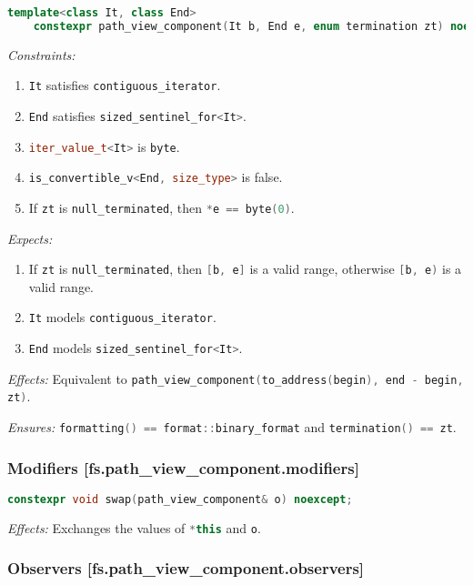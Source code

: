 \documentclass[11pt]{article}
\newcommand{\code}[2][cpp]{\lstinline[language=#1,basicstyle=\small\ttfamily]{#2}}
\newcommand{\desc}[1]{\textit{#1}}
\newcommand{\constraints}{\desc{Constraints: }}
\newcommand{\effects}{\desc{Effects: }}
\newcommand{\expects}{\desc{Expects: }}
\newcommand{\ensures}{\desc{Ensures: }}
\begin{document}
\begin{lstlisting}[language=cpp]
    template<class It, class End>
    constexpr path_view_component(It b, End e, enum termination zt) noexcept;
\end{lstlisting}
\constraints \begin{enumerate}
    \item \code{It} satisfies \code{contiguous_iterator}.
    \item \code{End} satisfies \code{sized_sentinel_for<It>}.
    \item \code{iter_value_t<It>} is \code{byte}.
    \item \code{is_convertible_v<End, size_type>} is false.
    \item If \code{zt} is \code{null_terminated}, then \code{*e == byte(0)}.
\end{enumerate}
\expects \begin{enumerate}
    \item If \code{zt} is \code{null_terminated}, then \code{[b, e]} is a valid range, otherwise \code{[b, e)} is a valid range.
    \item \code{It} models \code{contiguous_iterator}.
    \item \code{End} models \code{sized_sentinel_for<It>}.
\end{enumerate}

\effects Equivalent to \code{path_view_component(to_address(begin), end - begin, zt)}.

\ensures \code{formatting() == format::binary_format} and \code{termination() == zt}.\\

\subsubsection*{Modifiers [fs.path\_view\_component.modifiers]}

\begin{lstlisting}[language=cpp]
    constexpr void swap(path_view_component& o) noexcept;
\end{lstlisting}

\effects Exchanges the values of \code{*this} and \code{o}.\\

\subsubsection*{Observers [fs.path\_view\_component.observers]}
\end{document}
